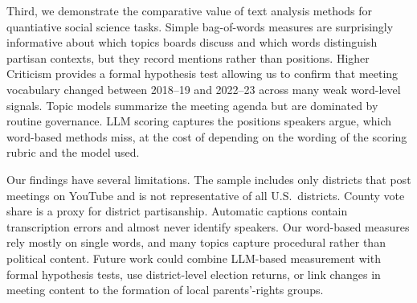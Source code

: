 \documentclass[12pt]{article}
\begin{document}
Third, we demonstrate the comparative value of text analysis methods for quantiative social science tasks.  Simple bag-of-words
measures are surprisingly informative about which topics boards discuss and which
words distinguish partisan contexts, but they record mentions rather than
positions. Higher Criticism provides a formal hypothesis test allowing us to confirm that meeting vocabulary changed between 2018--19 and 2022--23 across many weak word-level signals. Topic
models summarize the meeting agenda but are dominated by routine governance.
LLM scoring captures the positions speakers argue, which word-based methods miss,
at the cost of depending on the wording of the scoring rubric and the model used.

Our findings have several limitations. The sample includes only districts that
post meetings on YouTube and is not representative of all U.S.\ districts. County
vote share is a proxy for district partisanship. Automatic captions contain
transcription errors and almost never identify speakers. Our word-based measures
rely mostly on single words, and many topics capture procedural rather than
political content. Future work could combine LLM-based measurement with formal
hypothesis tests, use district-level election returns, or link changes in meeting
content to the formation of local parents'-rights groups.


{\small

}


\clearpage
\appendix

\end{document}
